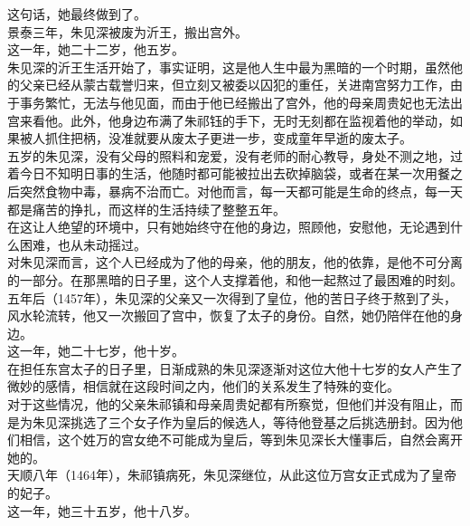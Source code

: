 \begin{multicols}{\theparacolNo}
这句话，她最终做到了。\\

景泰三年，朱见深被废为沂王，搬出宫外。\\

这一年，她二十二岁，他五岁。\\

朱见深的沂王生活开始了，事实证明，这是他人生中最为黑暗的一个时期，虽然他的父亲已经从蒙古载誉归来，但立刻又被委以囚犯的重任，关进南宫努力工作，由于事务繁忙，无法与他见面，而由于他已经搬出了宫外，他的母亲周贵妃也无法出宫来看他。此外，他身边布满了朱祁钰的手下，无时无刻都在监视着他的举动，如果被人抓住把柄，没准就要从废太子更进一步，变成童年早逝的废太子。\\

五岁的朱见深，没有父母的照料和宠爱，没有老师的耐心教导，身处不测之地，过着今日不知明日事的生活，他随时都可能被拉出去砍掉脑袋，或者在某一次用餐之后突然食物中毒，暴病不治而亡。对他而言，每一天都可能是生命的终点，每一天都是痛苦的挣扎，而这样的生活持续了整整五年。\\

在这让人绝望的环境中，只有她始终守在他的身边，照顾他，安慰他，无论遇到什么困难，也从未动摇过。\\

对朱见深而言，这个人已经成为了他的母亲，他的朋友，他的依靠，是他不可分离的一部分。在那黑暗的日子里，这个人支撑着他，和他一起熬过了最困难的时刻。\\

五年后（1457年），朱见深的父亲又一次得到了皇位，他的苦日子终于熬到了头，风水轮流转，他又一次搬回了宫中，恢复了太子的身份。自然，她仍陪伴在他的身边。\\

这一年，她二十七岁，他十岁。\\

在担任东宫太子的日子里，日渐成熟的朱见深逐渐对这位大他十七岁的女人产生了微妙的感情，相信就在这段时间之内，他们的关系发生了特殊的变化。\\

对于这些情况，他的父亲朱祁镇和母亲周贵妃都有所察觉，但他们并没有阻止，而是为朱见深挑选了三个女子作为皇后的候选人，等待他登基之后挑选册封。因为他们相信，这个姓万的宫女绝不可能成为皇后，等到朱见深长大懂事后，自然会离开她的。\\

天顺八年（1464年），朱祁镇病死，朱见深继位，从此这位万宫女正式成为了皇帝的妃子。\\

这一年，她三十五岁，他十八岁。\\


\end{multicols}
